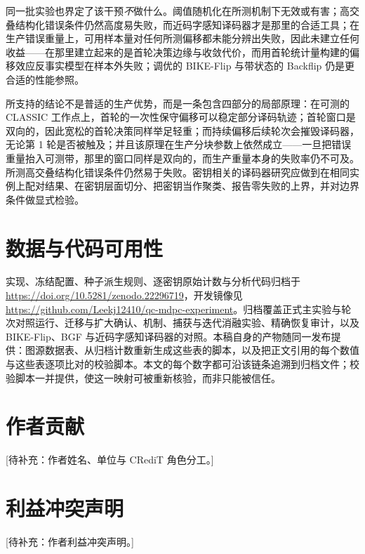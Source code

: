 \documentclass[UTF8,a4paper,10pt,twocolumn]{ctexart}
\begin{document}
同一批实验也界定了该干预\emph{不}做什么。阈值随机化在所测机制下无效或有害；高交叠结构化错误条件仍然高度易失败，而近码字感知译码器才是那里的合适工具；在生产错误重量上，可用样本量对任何所测偏移都未能分辨出失败，因此未建立任何收益——在那里建立起来的是首轮决策边缘与收敛代价，而用首轮统计量构建的偏移效应反事实模型在样本外失败；调优的 BIKE-Flip 与带状态的 Backflip 仍是更合适的性能参照。

所支持的结论不是普适的生产优势，而是一条包含四部分的局部原理：在可测的 CLASSIC 工作点上，首轮的一次性保守偏移可以稳定部分译码轨迹；首轮窗口是双向的，因此宽松的首轮决策同样举足轻重；而持续偏移后续轮次会摧毁译码器，无论第 1 轮是否被触及；并且该原理在生产分块参数上依然成立——一旦把错误重量抬入可测带，那里的窗口同样是双向的，而生产重量本身的失败率仍不可及。所测高交叠结构化错误条件仍然易于失败。密钥相关的译码器研究应做到在相同实例上配对结果、在密钥层面切分、把密钥当作聚类、报告零失败的上界，并对边界条件做显式检验。

\section*{数据与代码可用性}
实现、冻结配置、种子派生规则、逐密钥原始计数与分析代码归档于 \url{https://doi.org/10.5281/zenodo.22296719}，开发镜像见 \url{https://github.com/Leekj12410/qc-mdpc-experiment}。归档覆盖正式主实验与轮次对照运行、迁移与扩大确认、机制、捕获与迭代消融实验、精确恢复审计，以及 BIKE-Flip、BGF 与近码字感知译码器的对照。本稿自身的产物随同一发布提供：图源数据表、从归档计数重新生成这些表的脚本，以及把正文引用的每个数值与这些表逐项比对的校验脚本。本文的每个数字都可沿该链条追溯到归档文件；校验脚本一并提供，使这一映射可被重新核验，而非只能被信任。

\section*{作者贡献}
[待补充：作者姓名、单位与 CRediT 角色分工。]

\section*{利益冲突声明}
[待补充：作者利益冲突声明。]



\end{document}
